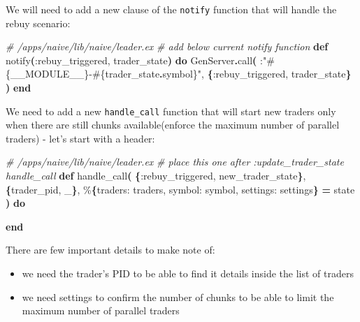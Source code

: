 \documentclass[
  oneside]{book}
\newenvironment{Shaded}{\begin{snugshade}}{\end{snugshade}}
\newcommand{\CommentTok}[1]{\textcolor[rgb]{0.56,0.35,0.01}{\textit{#1}}}
\newcommand{\ConstantTok}[1]{\textcolor[rgb]{0.56,0.35,0.01}{#1}}
\newcommand{\FunctionTok}[1]{\textcolor[rgb]{0.13,0.29,0.53}{\textbf{#1}}}
\newcommand{\KeywordTok}[1]{\textcolor[rgb]{0.13,0.29,0.53}{\textbf{#1}}}
\newcommand{\NormalTok}[1]{#1}
\newcommand{\OperatorTok}[1]{\textcolor[rgb]{0.81,0.36,0.00}{\textbf{#1}}}
\newcommand{\OtherTok}[1]{\textcolor[rgb]{0.56,0.35,0.01}{#1}}
\newcommand{\StringTok}[1]{\textcolor[rgb]{0.31,0.60,0.02}{#1}}
\newcommand{\VariableTok}[1]{\textcolor[rgb]{0.00,0.00,0.00}{#1}}
\providecommand{\tightlist}{%
  \setlength{\itemsep}{0pt}\setlength{\parskip}{0pt}}
\begin{document}
We will need to add a new clause of the \texttt{notify} function that will handle the rebuy scenario:

\begin{Shaded}
\begin{Highlighting}[]
  \CommentTok{\# /apps/naive/lib/naive/leader.ex}
  \CommentTok{\# add below current \textasciigrave{}notify\textasciigrave{} function}
  \KeywordTok{def}\NormalTok{ notify}\FunctionTok{(}\VariableTok{:rebuy\_triggered}\NormalTok{, trader\_state}\FunctionTok{)} \KeywordTok{do}
    \ConstantTok{GenServer}\OperatorTok{.}\NormalTok{call}\FunctionTok{(}
\NormalTok{      :}\StringTok{"}\OtherTok{\#\{}\ConstantTok{\_\_MODULE\_\_}\OtherTok{\}}\StringTok{{-}}\OtherTok{\#\{}\NormalTok{trader\_state}\OperatorTok{.}\NormalTok{symbol}\OtherTok{\}}\StringTok{"}\NormalTok{,}
      \FunctionTok{\{}\VariableTok{:rebuy\_triggered}\NormalTok{, trader\_state}\FunctionTok{\}}
    \FunctionTok{)}
  \KeywordTok{end}
\end{Highlighting}
\end{Shaded}

We need to add a new \texttt{handle\_call} function that will start new traders only when there are still chunks available(enforce the maximum number of parallel traders) - let's start with a header:

\begin{Shaded}
\begin{Highlighting}[]
  \CommentTok{\# /apps/naive/lib/naive/leader.ex}
  \CommentTok{\# place this one after :update\_trader\_state handle\_call}
  \KeywordTok{def}\NormalTok{ handle\_call}\FunctionTok{(}
        \FunctionTok{\{}\VariableTok{:rebuy\_triggered}\NormalTok{, new\_trader\_state}\FunctionTok{\}}\NormalTok{,}
        \FunctionTok{\{}\NormalTok{trader\_pid, \_}\FunctionTok{\}}\NormalTok{,}
\NormalTok{        \%}\FunctionTok{\{}\VariableTok{traders:}\NormalTok{ traders, }\VariableTok{symbol:}\NormalTok{ symbol, }\VariableTok{settings:}\NormalTok{ settings}\FunctionTok{\}} \OperatorTok{=}\NormalTok{ state}
      \FunctionTok{)} \KeywordTok{do}

  \KeywordTok{end}
\end{Highlighting}
\end{Shaded}

There are few important details to make note of:

\begin{itemize}
\tightlist
\item
  we need the trader's PID to be able to find it details inside the list of traders
\item
  we need settings to confirm the number of chunks to be able to limit the maximum number of parallel traders
\end{itemize}
\end{document}
